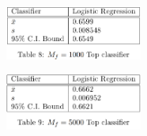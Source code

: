 \documentclass[11pt]{article}
\begin{document}

\begin{figure}[H]
	\centering
	\includegraphics[width = 0.4\textwidth]{mf1000.png}
	\label{tbl:mf1000}
\end{figure} 



\begin{figure}[H]
	\centering
	\includegraphics[width = 0.4\textwidth]{mf5000.png}
	\label{tbl:mf5000}
\end{figure} 
\end{document}
